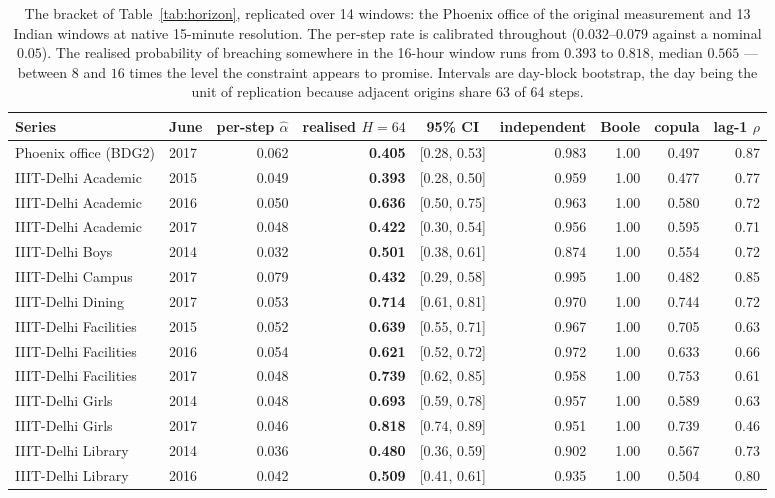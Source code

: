 \begin{table}[t]
\centering
\scriptsize
\setlength{\tabcolsep}{3pt}
\begin{tabular}{llrrcrrrr}
\toprule
Series & June & per-step $\hat\alpha$ & realised $H{=}64$ & 95\% CI & independent & Boole & copula & lag-1 $\rho$ \\
\midrule
Phoenix office (BDG2) & 2017 & 0.062 & \textbf{0.405} & [0.28, 0.53] & 0.983 & 1.00 & 0.497 & 0.87 \\
\midrule
IIIT-Delhi Academic & 2015 & 0.049 & \textbf{0.393} & [0.28, 0.50] & 0.959 & 1.00 & 0.477 & 0.77 \\
IIIT-Delhi Academic & 2016 & 0.050 & \textbf{0.636} & [0.50, 0.75] & 0.963 & 1.00 & 0.580 & 0.72 \\
IIIT-Delhi Academic & 2017 & 0.048 & \textbf{0.422} & [0.30, 0.54] & 0.956 & 1.00 & 0.595 & 0.71 \\
IIIT-Delhi Boys & 2014 & 0.032 & \textbf{0.501} & [0.38, 0.61] & 0.874 & 1.00 & 0.554 & 0.72 \\
IIIT-Delhi Campus & 2017 & 0.079 & \textbf{0.432} & [0.29, 0.58] & 0.995 & 1.00 & 0.482 & 0.85 \\
IIIT-Delhi Dining & 2017 & 0.053 & \textbf{0.714} & [0.61, 0.81] & 0.970 & 1.00 & 0.744 & 0.72 \\
IIIT-Delhi Facilities & 2015 & 0.052 & \textbf{0.639} & [0.55, 0.71] & 0.967 & 1.00 & 0.705 & 0.63 \\
IIIT-Delhi Facilities & 2016 & 0.054 & \textbf{0.621} & [0.52, 0.72] & 0.972 & 1.00 & 0.633 & 0.66 \\
IIIT-Delhi Facilities & 2017 & 0.048 & \textbf{0.739} & [0.62, 0.85] & 0.958 & 1.00 & 0.753 & 0.61 \\
IIIT-Delhi Girls & 2014 & 0.048 & \textbf{0.693} & [0.59, 0.78] & 0.957 & 1.00 & 0.589 & 0.63 \\
IIIT-Delhi Girls & 2017 & 0.046 & \textbf{0.818} & [0.74, 0.89] & 0.951 & 1.00 & 0.739 & 0.46 \\
IIIT-Delhi Library & 2014 & 0.036 & \textbf{0.480} & [0.36, 0.59] & 0.902 & 1.00 & 0.567 & 0.73 \\
IIIT-Delhi Library & 2016 & 0.042 & \textbf{0.509} & [0.41, 0.61] & 0.935 & 1.00 & 0.504 & 0.80 \\
\bottomrule
\end{tabular}
\caption{The bracket of Table~\ref{tab:horizon}, replicated over 14 windows: the Phoenix office of the original measurement and 13 Indian windows at native 15-minute resolution. The per-step rate is calibrated throughout ($0.032$--$0.079$ against a nominal $0.05$). The realised probability of breaching somewhere in the 16-hour window runs from $0.393$ to $0.818$, median $0.565$ --- between $8$ and $16$ times the level the constraint appears to promise. Intervals are day-block bootstrap, the day being the unit of replication because adjacent origins share 63 of 64 steps.}
\label{tab:horizon-panel}
\end{table}
